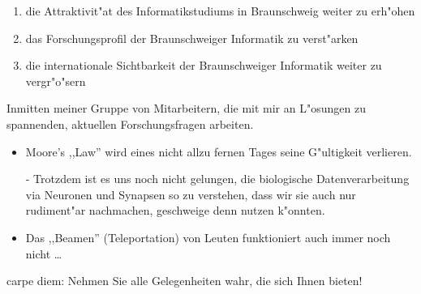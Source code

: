 
\begin{enumerate}
\item die Attraktivit"at des Informatikstudiums in Braunschweig weiter zu erh"ohen
\item das Forschungsprofil der Braunschweiger Informatik zu verst"arken
\item die internationale Sichtbarkeit der Braunschweiger Informatik weiter zu vergr"o"sern
\end{enumerate}


Inmitten meiner Gruppe von Mitarbeitern, die mit mir an L"osungen zu spannenden, aktuellen Forschungsfragen arbeiten.


\begin{itemize}
\item Moore's ,,Law'' wird eines nicht allzu fernen Tages seine G"ultigkeit verlieren.

- Trotzdem ist es uns noch nicht gelungen, die biologische Datenverarbeitung via Neuronen und Synapsen so zu verstehen, dass wir sie auch nur rudiment"ar nachmachen, geschweige denn nutzen k"onnten.

\item Das ,,Beamen'' (Teleportation) von Leuten funktioniert auch immer noch nicht \dots
\end{itemize}


carpe diem: Nehmen Sie alle Gelegenheiten wahr, die sich Ihnen bieten! 
